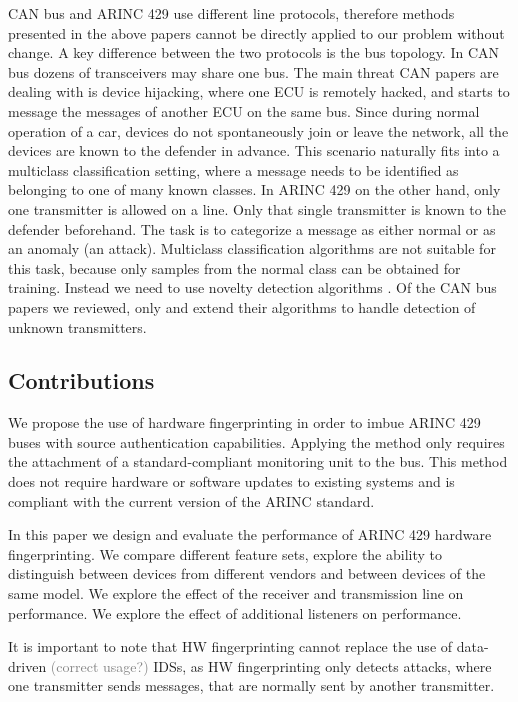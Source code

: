 \documentclass[conference]{IEEEtran}
\begin{document}
  CAN bus and ARINC 429 use different line protocols, therefore methods presented in the above papers cannot be directly applied to our problem without change. A key difference between the two protocols is the bus topology. In CAN bus dozens of transceivers may share one bus. The main threat CAN papers are dealing with is device hijacking, where one ECU is remotely hacked, and starts to message the messages of another ECU on the same bus. Since during normal operation of a car, devices do not spontaneously join or leave the network, all the devices are known to the defender in advance. This scenario naturally fits into a multiclass classification setting, where a message needs to be identified as belonging to one of many known classes. In ARINC 429 on the other hand, only one transmitter is allowed on a line. Only that single transmitter is known to the defender beforehand. The task is to categorize a message as either normal or as an anomaly (an attack). Multiclass classification algorithms are not suitable for this task, because only samples from the normal class can be obtained for training. Instead we need to use novelty detection algorithms \cite{pimentel2014review}. Of the CAN bus papers we reviewed, only \cite{choi2018identifying} and \cite{choi2018voltageids} extend their algorithms to handle detection of unknown transmitters.
  
\subsection{Contributions}
  We propose the use of hardware fingerprinting in order to imbue ARINC 429 buses with source authentication capabilities. Applying the method only requires the attachment of a standard-compliant monitoring unit to the bus. This method does not require hardware or software updates to existing systems and is compliant with the current version of the ARINC standard.
  
  In this paper we design and evaluate the performance of ARINC 429 hardware fingerprinting. We compare different feature sets, explore the ability to distinguish between devices from different vendors and between devices of the same model. We explore the effect of the receiver and transmission line on performance. We explore the effect of additional listeners on performance.
  
  It is important to note that HW fingerprinting cannot replace the use of data-driven \textcolor{gray}{(correct usage?)} IDSs, as HW fingerprinting only detects attacks, where one transmitter sends messages, that are normally sent by another transmitter.
  
\end{document}

